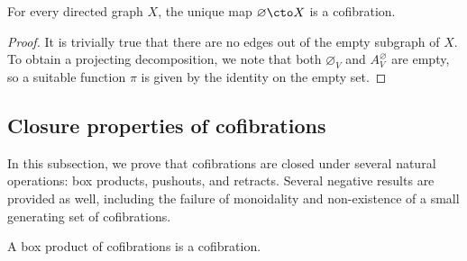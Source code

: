 \begin{proposition}\label{empty-cof}
For every directed graph $X$, the unique map $\varnothing \cto X$ is a cofibration. 
\end{proposition}

\begin{proof}
It is trivially true that there are no edges out of the empty subgraph of $X$. To obtain a projecting decomposition, we note that both $\varnothing_V$ and $A_V^\varnothing$ are empty, so a suitable function $\pi$ is given by the identity on the empty set.
\end{proof}

\subsection{Closure properties of cofibrations}

In this subsection, we prove that cofibrations are closed under several natural operations: box products, pushouts, and retracts.
Several negative results are provided as well, including the failure of monoidality and non-existence of a small generating set of cofibrations.

\begin{proposition}\label{box-prod-cofibs}
A box product of cofibrations is a cofibration.
\end{proposition}

